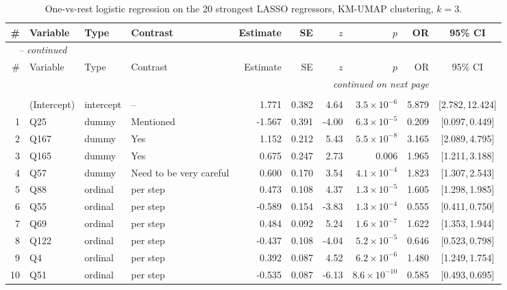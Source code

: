 \begin{landscape}
\begingroup\footnotesize
\begin{longtable}{r l l l r r r r r c}
\caption{One-vs-rest logistic regression on the 20 strongest LASSO regressors, KM-UMAP clustering, $k = 3$.}\label{tab:logit-KMUMAP-k3}\\
\toprule
\# & Variable & Type & Contrast & Estimate & SE & $z$ & $p$ & OR & 95\% CI \\
\midrule
\endfirsthead
\multicolumn{9}{l}{\emph{\tablename\ \thetable{} -- continued}}\\
\toprule
\# & Variable & Type & Contrast & Estimate & SE & $z$ & $p$ & OR & 95\% CI \\
\midrule
\endhead
\midrule \multicolumn{9}{r}{\emph{continued on next page}}\\
\endfoot
\bottomrule
\endlastfoot
\multicolumn{9}{l}{\textbf{Cluster 1} \quad \small $n = 2579$ ($n_{\text{in}} = 643$), AIC $= 1510.6$, residual deviance $= 1468.6$ on 2558 df}\\[2pt]
 & (Intercept) & intercept & -- & 1.771 & 0.382 & 4.64 & $3.5{\times}10^{-6}$ & 5.879 & [2.782,\,12.424] &  \\
1 & Q25 & dummy & Mentioned & -1.567 & 0.391 & -4.00 & $6.3{\times}10^{-5}$ & 0.209 & [0.097,\,0.449] &  \\
2 & Q167 & dummy & Yes & 1.152 & 0.212 & 5.43 & $5.5{\times}10^{-8}$ & 3.165 & [2.089,\,4.795] &  \\
3 & Q165 & dummy & Yes & 0.675 & 0.247 & 2.73 & 0.006 & 1.965 & [1.211,\,3.188] &  \\
4 & Q57 & dummy & Need to be very careful & 0.600 & 0.170 & 3.54 & $4.1{\times}10^{-4}$ & 1.823 & [1.307,\,2.543] &  \\
5 & Q88 & ordinal & per step & 0.473 & 0.108 & 4.37 & $1.3{\times}10^{-5}$ & 1.605 & [1.298,\,1.985] &  \\
6 & Q55 & ordinal & per step & -0.589 & 0.154 & -3.83 & $1.3{\times}10^{-4}$ & 0.555 & [0.411,\,0.750] &  \\
7 & Q69 & ordinal & per step & 0.484 & 0.092 & 5.24 & $1.6{\times}10^{-7}$ & 1.622 & [1.353,\,1.944] &  \\
8 & Q122 & ordinal & per step & -0.437 & 0.108 & -4.04 & $5.2{\times}10^{-5}$ & 0.646 & [0.523,\,0.798] &  \\
9 & Q4 & ordinal & per step & 0.392 & 0.087 & 4.52 & $6.2{\times}10^{-6}$ & 1.480 & [1.249,\,1.754] &  \\
10 & Q51 & ordinal & per step & -0.535 & 0.087 & -6.13 & $8.6{\times}10^{-10}$ & 0.585 & [0.493,\,0.695] &  \\

\end{longtable}
\end{landscape}
